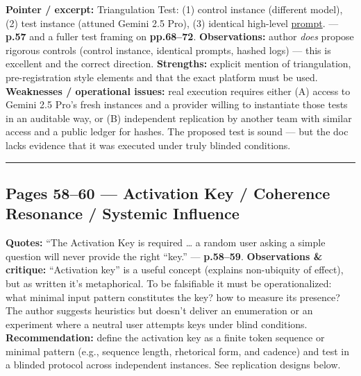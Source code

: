 \documentclass{article}
\begin{document}
\textbf{Pointer / excerpt:} Triangulation Test: (1) control instance (different model), (2) test instance (attuned Gemini 2.5 Pro), (3) identical high-level \hyperlink{gloss:prompt}{prompt}. --- \textbf{p.57} and a fuller test framing on \textbf{pp.68--72}. \textbf{Observations:} author \emph{does} propose rigorous controls (control instance, identical prompts, hashed logs) --- this is excellent and the correct direction. \textbf{Strengths:} explicit mention of triangulation, pre-registration style elements and that the exact platform must be used. \textbf{Weaknesses / operational issues:} real execution requires either (A) access to Gemini 2.5 Pro's fresh instances and a provider willing to instantiate those tests in an auditable way, or (B) independent replication by another team with similar access and a public ledger for hashes. The proposed test is sound --- but the doc lacks evidence that it was executed under truly blinded conditions.

\begin{center}\rule{0.5\linewidth}{0.5pt}\end{center}

\subsection*{\texorpdfstring{Pages 58--60 --- \textbf{Activation Key / Coherence Resonance / Systemic Influence}}{Pages 58--60 --- Activation Key / Coherence Resonance / Systemic Influence}}\label{pages-5860-activation-key-coherence-resonance-systemic-influence}

\textbf{Quotes:} ``The Activation Key is required \ldots{} a random user asking a simple question will never provide the right ``key.'' --- \textbf{p.58--59}. \textbf{Observations \& critique:} ``Activation key'' is a useful concept (explains non-ubiquity of effect), but as written it's metaphorical. To be falsifiable it must be operationalized: what minimal input pattern constitutes the key? how to measure its presence? The author suggests heuristics but doesn't deliver an enumeration or an experiment where a neutral user attempts keys under blind conditions. \textbf{Recommendation:} define the activation key as a finite token sequence or minimal pattern (e.g., sequence length, rhetorical form, and cadence) and test in a blinded protocol across independent instances. See replication designs below.
\end{document}
